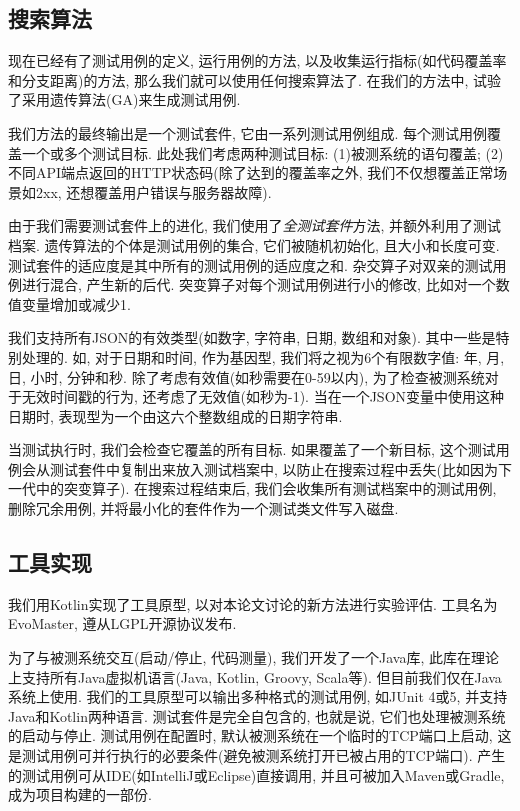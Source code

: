     \subsection{搜索算法}
    现在已经有了测试用例的定义, 运行用例的方法, 以及收集运行指标(如代码覆盖率和分支距离)的方法, 那么我们就可以使用任何搜索算法了. 在我们的方法中, 试验了采用遗传算法(GA)来生成测试用例.
    
    我们方法的最终输出是一个测试套件, 它由一系列测试用例组成. 每个测试用例覆盖一个或多个测试目标. 此处我们考虑两种测试目标: (1)被测系统的语句覆盖; (2)不同API端点返回的HTTP状态码(除了达到的覆盖率之外, 我们不仅想覆盖正常场景如2xx, 还想覆盖用户错误与服务器故障). 
    
    由于我们需要测试套件上的进化, 我们使用了\textit{全测试套件}方法, 并额外利用了测试档案. 遗传算法的个体是测试用例的集合, 它们被随机初始化, 且大小和长度可变. 测试套件的适应度是其中所有的测试用例的适应度之和. 杂交算子对双亲的测试用例进行混合, 产生新的后代. 突变算子对每个测试用例进行小的修改, 比如对一个数值变量增加或减少1.
    
    我们支持所有JSON的有效类型(如数字, 字符串, 日期, 数组和对象). 其中一些是特别处理的. 如, 对于日期和时间, 作为基因型, 我们将之视为6个有限数字值: 年, 月, 日, 小时, 分钟和秒. 除了考虑有效值(如秒需要在0-59以内), 为了检查被测系统对于无效时间戳的行为, 还考虑了无效值(如秒为-1). 当在一个JSON变量中使用这种日期时, 表现型为一个由这六个整数组成的日期字符串.
    
    当测试执行时, 我们会检查它覆盖的所有目标. 如果覆盖了一个新目标, 这个测试用例会从测试套件中复制出来放入测试档案中, 以防止在搜索过程中丢失(比如因为下一代中的突变算子). 在搜索过程结束后, 我们会收集所有测试档案中的测试用例, 删除冗余用例, 并将最小化的套件作为一个测试类文件写入磁盘.
    
    \subsection{工具实现}
    我们用Kotlin实现了工具原型, 以对本论文讨论的新方法进行实验评估. 工具名为EvoMaster, 遵从LGPL开源协议发布. 
    
    为了与被测系统交互(启动/停止, 代码测量), 我们开发了一个Java库, 此库在理论上支持所有Java虚拟机语言(Java, Kotlin, Groovy, Scala等). 但目前我们仅在Java系统上使用. 我们的工具原型可以输出多种格式的测试用例, 如JUnit 4或5, 并支持Java和Kotlin两种语言. 测试套件是完全自包含的, 也就是说, 它们也处理被测系统的启动与停止. 测试用例在配置时, 默认被测系统在一个临时的TCP端口上启动, 这是测试用例可并行执行的必要条件(避免被测系统打开已被占用的TCP端口). 产生的测试用例可从IDE(如IntelliJ或Eclipse)直接调用, 并且可被加入Maven或Gradle, 成为项目构建的一部份. 
    
